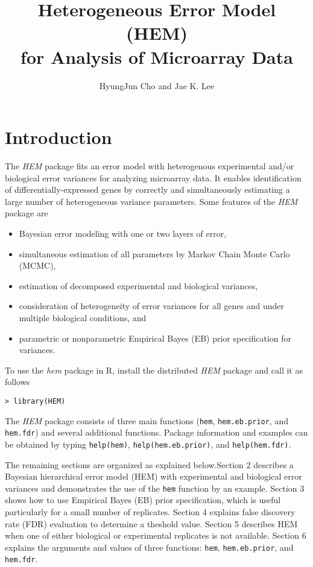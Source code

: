 \documentclass[12pt]{article}
\author{HyungJun Cho and Jae K. Lee}
\newcommand{\Rfunction}[1]{{\texttt{#1}}}
\newcommand{\Rpackage}[1]{{\textit{#1}}}
\begin{document}
\title{Heterogeneous Error Model (HEM) \\ for Analysis of Microarray Data}

\maketitle
\tableofcontents

\section{Introduction}
The \Rpackage{HEM} package fits an error model with heterogenous experimental and/or biological error variances 
for analyzing microarray data. It enables identification of differentially-expressed genes 
by correctly and simultaneously estimating a large number of heterogeneous variance parameters.
Some features of the \Rpackage{HEM} package are 

\begin{itemize}
\item Bayesian error modeling with one or two layers of error, 
\item simultaneous estimation of all parameters by Markov Chain Monte Carlo (MCMC),
\item estimation of decomposed experimental and biological variances, 
\item consideration of heterogeneity of error variances for all genes and under multiple biological conditions, and
\item parametric or nonparametric Empirical Bayes (EB) prior specification for variances. 
\end{itemize}
To use the \Rpackage{hem} package in R, install the distributed \Rpackage{HEM} package and call it as follows
\begin{verbatim}
> library(HEM) 
\end{verbatim}
The \Rpackage{HEM} package consists of three main functions (\Rfunction{hem}, \Rfunction{hem.eb.prior}, and \Rfunction{hem.fdr}) 
and several additional functions. Package information and examples can be obtained by typing \Rfunction{help(hem)}, \Rfunction{help(hem.eb.prior)}, and \Rfunction{help(hem.fdr)}.

The remaining sections are organized as explained below.Section 2 describes a Bayesian hierarchical error model (HEM) 
with experimental and biological error variances 
and demonstrates the use of the  \Rfunction{hem}  function by an example. 
Section 3 shows how to use Empirical Bayes (EB) prior specification, which is useful particularly for a small number of replicates.
Section 4 explains false discovery rate (FDR) evaluation to determine a theshold value.  
Section 5 describes HEM when one of either biological or experimental replicates is not available.
Section 6 explains the arguments and values of three functions: \Rfunction{hem}, \Rfunction{hem.eb.prior}, and \Rfunction{hem.fdr}. 
\end{document}
